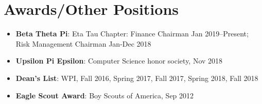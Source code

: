 \documentclass[letterpaper,11pt]{article}
\newcommand{\resumeItem}[2]{
  \item\small{
    \textbf{#1}{: #2 \vspace{-2pt}}
  }
}
\newcommand{\resumeSubItem}[2]{\resumeItem{#1}{#2}\vspace{-4pt}}
\newcommand{\resumeSubHeadingListStart}{\begin{itemize}[leftmargin=*]}
\newcommand{\resumeSubHeadingListEnd}{\end{itemize}}
\begin{document}
\section{Awards/Other Positions}
  \resumeSubHeadingListStart
    \resumeSubItem{Beta Theta Pi}
      {Eta Tau Chapter: Finance Chairman Jan 2019--Present; Risk Management Chairman Jan-Dec 2018}
    \resumeSubItem{Upsilon Pi Epsilon}
      {Computer Science honor society, Nov 2018}
    \resumeSubItem{Dean's List}
      {WPI, Fall 2016, Spring 2017, Fall 2017, Spring 2018, Fall 2018}
    \resumeSubItem{Eagle Scout Award}
      {Boy Scouts of America, Sep 2012}
  \resumeSubHeadingListEnd

\end{document}
